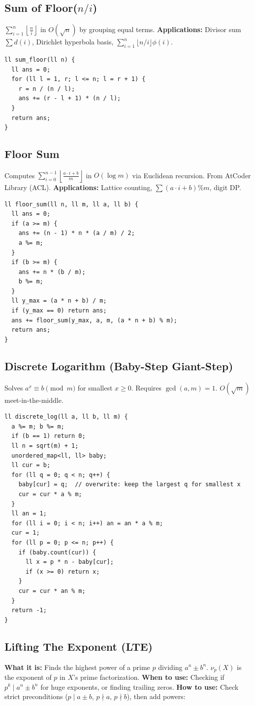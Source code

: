 \subsection{Sum of Floor($n/i$)}
$\displaystyle\sum_{i=1}^n \left\lfloor\frac{n}{i}\right\rfloor$ in $O(\sqrt{n})$ by grouping equal terms.
\textbf{Applications:} Divisor sum $\sum d(i)$, Dirichlet hyperbola basis, $\sum_{i=1}^n \lfloor n/i\rfloor \phi(i)$.
\begin{verbatim}
ll sum_floor(ll n) {
  ll ans = 0;
  for (ll l = 1, r; l <= n; l = r + 1) {
    r = n / (n / l);
    ans += (r - l + 1) * (n / l);
  }
  return ans;
}
\end{verbatim}

\subsection{Floor Sum}
Computes $\displaystyle\sum_{i=0}^{n-1} \left\lfloor\frac{a\cdot i + b}{m}\right\rfloor$ in $O(\log m)$ via Euclidean recursion. From AtCoder Library (ACL).
\textbf{Applications:} Lattice counting, $\sum (a\cdot i + b) \% m$, digit DP.
\begin{verbatim}
ll floor_sum(ll n, ll m, ll a, ll b) {
  ll ans = 0;
  if (a >= m) {
    ans += (n - 1) * n * (a / m) / 2;
    a %= m;
  }
  if (b >= m) {
    ans += n * (b / m);
    b %= m;
  }
  ll y_max = (a * n + b) / m;
  if (y_max == 0) return ans;
  ans += floor_sum(y_max, a, m, (a * n + b) % m);
  return ans;
}
\end{verbatim}

\subsection{Discrete Logarithm (Baby-Step Giant-Step)}
Solves $a^x \equiv b \pmod m$ for smallest $x \ge 0$. Requires $\gcd(a,m)=1$. $O(\sqrt{m})$ meet-in-the-middle.
\begin{verbatim}
ll discrete_log(ll a, ll b, ll m) {
  a %= m; b %= m;
  if (b == 1) return 0;
  ll n = sqrt(m) + 1;
  unordered_map<ll, ll> baby;
  ll cur = b;
  for (ll q = 0; q < n; q++) {
    baby[cur] = q;  // overwrite: keep the largest q for smallest x
    cur = cur * a % m;
  }
  ll an = 1;
  for (ll i = 0; i < n; i++) an = an * a % m;
  cur = 1;
  for (ll p = 0; p <= n; p++) {
    if (baby.count(cur)) {
      ll x = p * n - baby[cur];
      if (x >= 0) return x;
    }
    cur = cur * an % m;
  }
  return -1;
}
\end{verbatim}

\subsection{Lifting The Exponent (LTE)}
\textbf{What it is:} Finds the highest power of a prime $p$ dividing $a^n \pm b^n$. $\nu_p(X)$ is the exponent of $p$ in $X$'s prime factorization. 
\textbf{When to use:} Checking if $p^k \mid a^n \pm b^n$ for huge exponents, or finding trailing zeros.
\textbf{How to use:} Check strict preconditions ($p \mid a \pm b$, $p \nmid a$, $p \nmid b$), then add powers:

